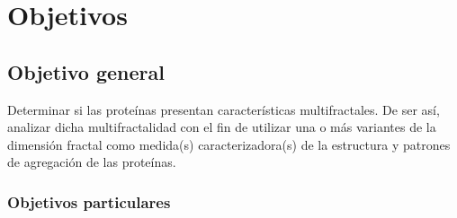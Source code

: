 \chapter{Objetivos}
\label{chap:obj}

\section{Objetivo general}
\label{sec:objg}

Determinar si las prote\'{i}nas presentan caracter\'{i}sticas multifractales. De ser as\'{i}, analizar dicha multifractalidad con el fin de utilizar una o m\'{a}s variantes de la
dimensi\'{o}n fractal como medida(s) caracterizadora(s)
de la estructura y patrones de agregaci\'{o}n de las prote\'{i}nas.



\subsection{Objetivos particulares}
\label{subsec:objp}

